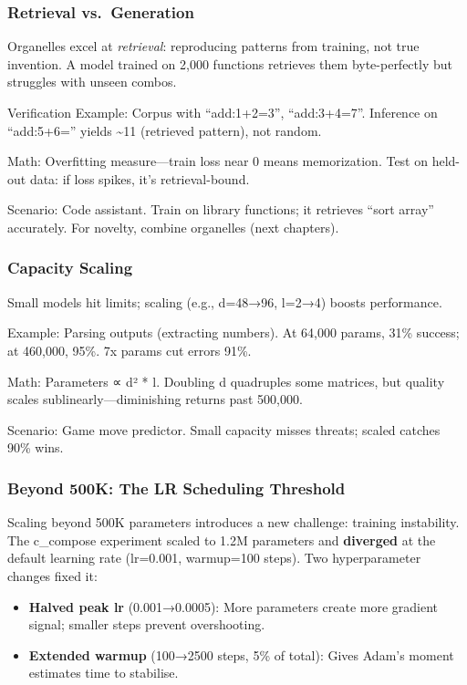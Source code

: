 \documentclass[
]{article}
\providecommand{\tightlist}{%
  \setlength{\itemsep}{0pt}\setlength{\parskip}{0pt}}
\begin{document}
\subsubsection{Retrieval vs.~Generation}\label{retrieval-vs.-generation}

Organelles excel at \emph{retrieval}: reproducing patterns from
training, not true invention. A model trained on 2,000 functions
retrieves them byte-perfectly but struggles with unseen combos.

Verification Example: Corpus with ``add:1+2=3'', ``add:3+4=7''.
Inference on ``add:5+6='' yields \textasciitilde11 (retrieved pattern),
not random.

Math: Overfitting measure---train loss near 0 means memorization. Test
on held-out data: if loss spikes, it's retrieval-bound.

Scenario: Code assistant. Train on library functions; it retrieves
``sort array'' accurately. For novelty, combine organelles (next
chapters).

\subsubsection{Capacity Scaling}\label{capacity-scaling}

Small models hit limits; scaling (e.g., d=48→96, l=2→4) boosts
performance.

Example: Parsing outputs (extracting numbers). At 64,000 params, 31\%
success; at 460,000, 95\%. 7x params cut errors 91\%.

Math: Parameters ∝ d² * l. Doubling d quadruples some matrices, but
quality scales sublinearly---diminishing returns past 500,000.

Scenario: Game move predictor. Small capacity misses threats; scaled
catches 90\% wins.

\subsubsection{Beyond 500K: The LR Scheduling
Threshold}\label{beyond-500k-the-lr-scheduling-threshold}

Scaling beyond 500K parameters introduces a new challenge: training
instability. The c\_compose experiment scaled to 1.2M parameters and
\textbf{diverged} at the default learning rate (lr=0.001, warmup=100
steps). Two hyperparameter changes fixed it:

\begin{itemize}
\tightlist
\item
  \textbf{Halved peak lr} (0.001→0.0005): More parameters create more
  gradient signal; smaller steps prevent overshooting.
\item
  \textbf{Extended warmup} (100→2500 steps, 5\% of total): Gives Adam's
  moment estimates time to stabilise.
\end{itemize}
\end{document}
